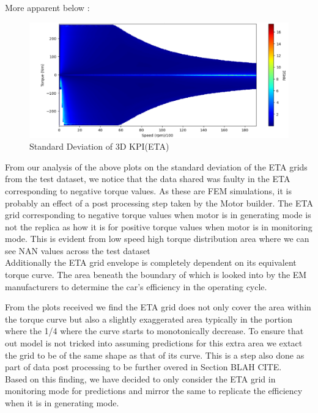 \documentclass{report} %
\begin{document}
More apparent below :

\begin{figure}[H]
    \centering
    \includegraphics[width=1\textwidth]{./ReportImages/colorful_stddev_y2.png} 
    \caption{Standard Deviation of 3D KPI(ETA)} 
    \label{fig:Standard Deviation of 3D KPI(ETA)}
\end{figure}

From our analysis of the above plots on the standard deviation of the ETA grids from the test dataset, we notice that the data shared was faulty in the ETA corresponding to negative torque values.
As these are FEM simulations, it is probably an effect of a post processing step taken by the Motor builder.
The ETA grid corresponding to negative torque values when motor is in generating mode is not the replica as how it is for positive torque values when motor is in monitoring mode. 
This is evident from low speed high torque distribution area where we can see NAN values across the test dataset\\

Additionally the ETA grid envelope is completely dependent on its equivalent torque curve. The area beneath the boundary of which is looked into by the \ac{EM} manufacturers to determine the car's efficiency in the operating cycle.

From the plots received we find the ETA grid does not only cover the area within the torque curve but also a slightly exaggerated area typically in the portion where the 1/4 where the curve starts to monotonically decrease.
To ensure that out model is not tricked into assuming predictions for this extra area we extact the grid to be of the same shape as that of its curve.
This is a step also done as part of data post processing to be further overed in Section BLAH CITE. \\

Based on this finding, we have decided to only consider the ETA grid in monitoring mode for predictions and mirror the same to replicate the efficiency when it is in generating mode.\\
\end{document}
